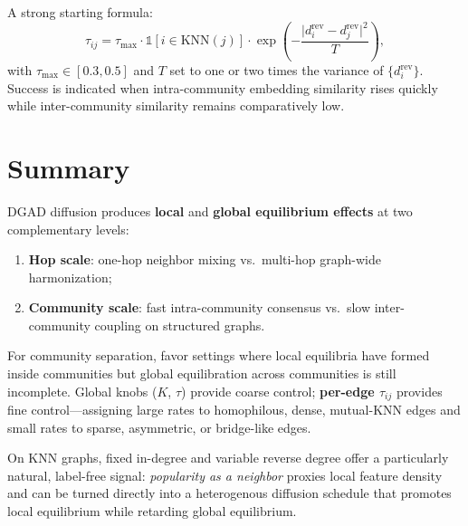 \documentclass[11pt,a4paper]{report}
\begin{document}
A strong starting formula:
\begin{equation}
    \tau_{ij} = \tau_{\max}\cdot \mathbb{1}[i \in \mathrm{KNN}(j)]\cdot \exp\!\left(-\frac{\bigl|d^{\mathrm{rev}}_i - d^{\mathrm{rev}}_j\bigr|^2}{T}\right),
\end{equation}
with $\tau_{\max} \in [0.3, 0.5]$ and $T$ set to one or two times the variance of $\{d^{\mathrm{rev}}_i\}$. Success is indicated when intra-community embedding similarity rises quickly while inter-community similarity remains comparatively low.

\chapter{Summary}

DGAD diffusion produces \textbf{local} and \textbf{global equilibrium effects} at two complementary levels:
\begin{enumerate}
    \item \textbf{Hop scale}: one-hop neighbor mixing vs.\ multi-hop graph-wide harmonization;
    \item \textbf{Community scale}: fast intra-community consensus vs.\ slow inter-community coupling on structured graphs.
\end{enumerate}

For community separation, favor settings where local equilibria have formed inside communities but global equilibration across communities is still incomplete. Global knobs ($K$, $\tau$) provide coarse control; \textbf{per-edge $\tau_{ij}$} provides fine control---assigning large rates to homophilous, dense, mutual-KNN edges and small rates to sparse, asymmetric, or bridge-like edges.

On KNN graphs, fixed in-degree and variable reverse degree offer a particularly natural, label-free signal: \emph{popularity as a neighbor} proxies local feature density and can be turned directly into a heterogenous diffusion schedule that promotes local equilibrium while retarding global equilibrium.
\end{document}
